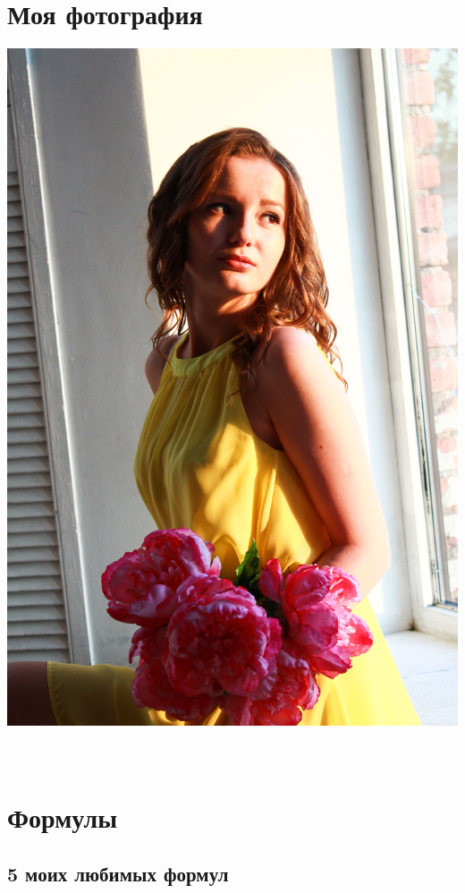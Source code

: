 \documentclass[12pt, a4paper]{article}
\begin{document}
\section{Моя фотография}
\includegraphics[scale=0.25]{MyPhoto}
\\\\\\
\section{Формулы}
\subsection{5 моих любимых формул}
\end{document}
